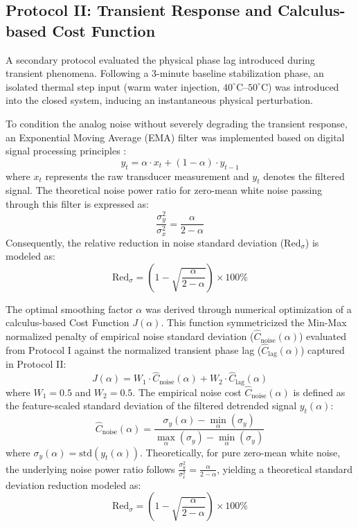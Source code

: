 \subsection{Protocol II: Transient Response and Calculus-based Cost Function}
A secondary protocol evaluated the physical phase lag introduced during transient phenomena. 
Following a 3-minute baseline stabilization phase, an isolated thermal step input (warm water injection, $40^\circ\text{C}$--$50^\circ\text{C}$) was introduced into the closed system, 
inducing an instantaneous physical perturbation. 

To condition the analog noise without severely degrading the transient response, 
an Exponential Moving Average (EMA) filter was implemented based on digital signal processing principles \cite{pieterp_ema}:
\begin{equation}
y_t = \alpha \cdot x_t + (1 - \alpha) \cdot y_{t-1} \label{eq:ema02}
\end{equation}
where $x_t$ represents the raw transducer measurement and $y_t$ denotes the filtered signal. 
The theoretical noise power ratio for zero-mean white noise passing through this filter is expressed as:
\begin{equation}
\frac{\sigma_y^2}{\sigma_x^2} = \frac{\alpha}{2-\alpha} \label{eq:noise_power_ratio}
\end{equation}
Consequently, the relative reduction in noise standard deviation ($\text{Red}_{\sigma}$) is modeled as:
\begin{equation}
\text{Red}_{\sigma} = \left(1 - \sqrt{\frac{\alpha}{2-\alpha}}\right) \times 100\% \label{eq:red_sigma}
\end{equation}

The optimal smoothing factor $\alpha$ was derived through numerical optimization of a calculus-based Cost Function $J(\alpha)$. 
This function symmetricized the Min-Max normalized penalty of empirical noise standard deviation ($\hat{C}_{\text{noise}}(\alpha)$) evaluated from Protocol I against the normalized transient phase lag ($\hat{C}_{\text{lag}}(\alpha)$) captured in Protocol II:
\begin{equation}
J(\alpha) = W_1 \cdot \hat{C}_{\text{noise}}(\alpha) + W_2 \cdot \hat{C}_{\text{lag}}(\alpha) \label{eq:cost_func}
\end{equation}
where $W_1 = 0.5$ and $W_2 = 0.5$. The empirical noise cost $\hat{C}_{\text{noise}}(\alpha)$ is defined as the feature-scaled standard deviation of the filtered detrended signal $y_t(\alpha)$:
\begin{equation}
\hat{C}_{\text{noise}}(\alpha) = \frac{\sigma_y(\alpha) - \min_{\alpha}(\sigma_y)}{\max_{\alpha}(\sigma_y) - \min_{\alpha}(\sigma_y)} \label{eq:norm_noise}
\end{equation}
where $\sigma_y(\alpha) = \text{std}(y_t(\alpha))$. Theoretically, for pure zero-mean white noise, the underlying noise power ratio follows $\frac{\sigma_y^2}{\sigma_x^2} = \frac{\alpha}{2-\alpha}$, yielding a theoretical standard deviation reduction modeled as:
\begin{equation}
\text{Red}_{\sigma} = \left(1 - \sqrt{\frac{\alpha}{2-\alpha}}\right) \times 100\% \label{eq:red_sigma}
\end{equation}

